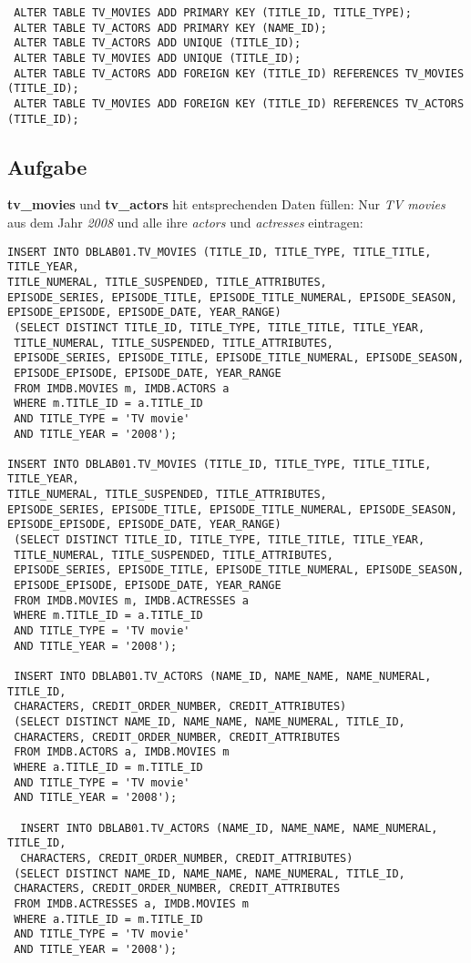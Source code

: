 \documentclass[11pt,a4paper,DIV=9]{scrartcl}
\newcounter{temp}
\newcommand{\aufgabe}[1]{
  \setcounter{temp}{\value{subsection}}
  \setcounter{subsection}{#1}
  \addtocounter{subsection}{-1}
  \subsection{Aufgabe}
  \setcounter{subsection}{\value{temp}}
}
\begin{document}
 \begin{lstlisting}
 ALTER TABLE TV_MOVIES ADD PRIMARY KEY (TITLE_ID, TITLE_TYPE);
 ALTER TABLE TV_ACTORS ADD PRIMARY KEY (NAME_ID); 
 ALTER TABLE TV_ACTORS ADD UNIQUE (TITLE_ID);
 ALTER TABLE TV_MOVIES ADD UNIQUE (TITLE_ID);
 ALTER TABLE TV_ACTORS ADD FOREIGN KEY (TITLE_ID) REFERENCES TV_MOVIES (TITLE_ID);
 ALTER TABLE TV_MOVIES ADD FOREIGN KEY (TITLE_ID) REFERENCES TV_ACTORS (TITLE_ID);
 \end{lstlisting}
 \aufgabe{6}
 \textbf{tv\_movies} und \textbf{tv\_actors} hit entsprechenden Daten f\"ullen:
 Nur \textit{TV movies} aus dem Jahr \textit{2008} und alle ihre \textit{actors} und \textit{actresses} eintragen:
 \begin{lstlisting}
INSERT INTO DBLAB01.TV_MOVIES (TITLE_ID, TITLE_TYPE, TITLE_TITLE, TITLE_YEAR, 
TITLE_NUMERAL, TITLE_SUSPENDED, TITLE_ATTRIBUTES, 
EPISODE_SERIES, EPISODE_TITLE, EPISODE_TITLE_NUMERAL, EPISODE_SEASON, 
EPISODE_EPISODE, EPISODE_DATE, YEAR_RANGE)
 (SELECT DISTINCT TITLE_ID, TITLE_TYPE, TITLE_TITLE, TITLE_YEAR, 
 TITLE_NUMERAL, TITLE_SUSPENDED, TITLE_ATTRIBUTES, 
 EPISODE_SERIES, EPISODE_TITLE, EPISODE_TITLE_NUMERAL, EPISODE_SEASON, 
 EPISODE_EPISODE, EPISODE_DATE, YEAR_RANGE
 FROM IMDB.MOVIES m, IMDB.ACTORS a
 WHERE m.TITLE_ID = a.TITLE_ID
 AND TITLE_TYPE = 'TV movie'
 AND TITLE_YEAR = '2008');
 
INSERT INTO DBLAB01.TV_MOVIES (TITLE_ID, TITLE_TYPE, TITLE_TITLE, TITLE_YEAR, 
TITLE_NUMERAL, TITLE_SUSPENDED, TITLE_ATTRIBUTES, 
EPISODE_SERIES, EPISODE_TITLE, EPISODE_TITLE_NUMERAL, EPISODE_SEASON, 
EPISODE_EPISODE, EPISODE_DATE, YEAR_RANGE)
 (SELECT DISTINCT TITLE_ID, TITLE_TYPE, TITLE_TITLE, TITLE_YEAR, 
 TITLE_NUMERAL, TITLE_SUSPENDED, TITLE_ATTRIBUTES, 
 EPISODE_SERIES, EPISODE_TITLE, EPISODE_TITLE_NUMERAL, EPISODE_SEASON, 
 EPISODE_EPISODE, EPISODE_DATE, YEAR_RANGE
 FROM IMDB.MOVIES m, IMDB.ACTRESSES a
 WHERE m.TITLE_ID = a.TITLE_ID
 AND TITLE_TYPE = 'TV movie'
 AND TITLE_YEAR = '2008');
 
 INSERT INTO DBLAB01.TV_ACTORS (NAME_ID, NAME_NAME, NAME_NUMERAL, TITLE_ID, 
 CHARACTERS, CREDIT_ORDER_NUMBER, CREDIT_ATTRIBUTES)
 (SELECT DISTINCT NAME_ID, NAME_NAME, NAME_NUMERAL, TITLE_ID, 
 CHARACTERS, CREDIT_ORDER_NUMBER, CREDIT_ATTRIBUTES
 FROM IMDB.ACTORS a, IMDB.MOVIES m
 WHERE a.TITLE_ID = m.TITLE_ID
 AND TITLE_TYPE = 'TV movie'
 AND TITLE_YEAR = '2008');
 
  INSERT INTO DBLAB01.TV_ACTORS (NAME_ID, NAME_NAME, NAME_NUMERAL, TITLE_ID, 
  CHARACTERS, CREDIT_ORDER_NUMBER, CREDIT_ATTRIBUTES)
 (SELECT DISTINCT NAME_ID, NAME_NAME, NAME_NUMERAL, TITLE_ID, 
 CHARACTERS, CREDIT_ORDER_NUMBER, CREDIT_ATTRIBUTES
 FROM IMDB.ACTRESSES a, IMDB.MOVIES m
 WHERE a.TITLE_ID = m.TITLE_ID
 AND TITLE_TYPE = 'TV movie'
 AND TITLE_YEAR = '2008');
 
 \end{lstlisting}
\end{document}
